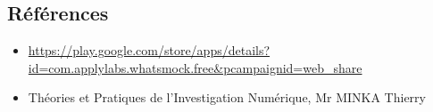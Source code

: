 \documentclass[12pt, a4paper]{article}
\begin{document}
\subsection*{Références}
\begin{itemize}
    \item \url{https://play.google.com/store/apps/details?id=com.applylabs.whatsmock.free&pcampaignid=web_share}
    \item Théories et Pratiques de l’Investigation Numérique, Mr MINKA Thierry
\end{itemize}
\end{document}
